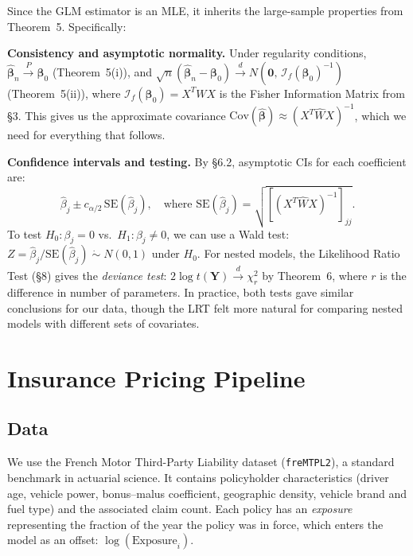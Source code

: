 \documentclass[11pt]{article}
\begin{document}
Since the GLM estimator is an MLE, it inherits the large-sample properties from Theorem~5.
Specifically:

\noindent \textbf{Consistency and asymptotic normality.} Under regularity conditions,
$\hat{\boldsymbol{\beta}}_n \xrightarrow{P} \boldsymbol{\beta}_0$ (Theorem~5(i)), and
$\sqrt{n}(\hat{\boldsymbol{\beta}}_n - \boldsymbol{\beta}_0)
\xrightarrow{d} N(\mathbf{0},\, \mathcal{I}_f(\boldsymbol{\beta}_0)^{-1})$ (Theorem~5(ii)), where
$\mathcal{I}_f(\boldsymbol{\beta}_0) = X^TWX$ is the Fisher Information Matrix from \S3.
This gives us the approximate covariance $\mathrm{Cov}(\hat{\boldsymbol{\beta}}) \approx (X^T\hat{W}X)^{-1}$,
which we need for everything that follows.

\noindent \textbf{Confidence intervals and testing.} By \S6.2, asymptotic CIs for each coefficient are:
\begin{equation*}
    \hat{\beta}_j \pm c_{\alpha/2}\,\mathrm{SE}(\hat{\beta}_j), \quad
    \text{where } \mathrm{SE}(\hat{\beta}_j) = \sqrt{[(X^T\hat{W}X)^{-1}]_{jj}}.
\end{equation*}
To test $H_0: \beta_j = 0$ vs.\ $H_1: \beta_j \neq 0$,
we can use a Wald test: $Z = \hat{\beta}_j / \mathrm{SE}(\hat{\beta}_j) \;\dot\sim\; N(0,1)$ under $H_0$.
For nested models, the Likelihood Ratio Test (\S8) gives the \textit{deviance test}:
$2\log t(\mathbf{Y}) \xrightarrow{d} \chi^2_r$ by Theorem~6, where $r$ is the difference in
number of parameters. In practice, both tests gave similar conclusions for our data, though the
LRT felt more natural for comparing nested models with different sets of covariates.

\section{Insurance Pricing Pipeline}

\subsection{Data}

We use the French Motor Third-Party Liability dataset (\texttt{freMTPL2}), a standard
benchmark in actuarial science. It contains policyholder characteristics
(driver age, vehicle power, bonus--malus coefficient, geographic density, vehicle brand and fuel type)
and the associated claim count. Each policy has an \textit{exposure}
representing the fraction of the year the policy was in force, which enters the model as an
offset: $\log(\mathrm{Exposure}_i)$.
\end{document}
